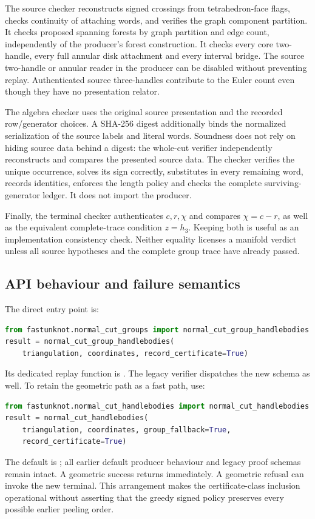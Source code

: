 The source checker reconstructs signed crossings from tetrahedron-face flags,
checks continuity of attaching words, and verifies the graph component
partition. It checks proposed spanning forests by graph partition and edge
count, independently of the producer's forest construction. It checks every
core two-handle, every full annular disk attachment and every interval bridge.
The source two-handle or annular reader in the producer can be disabled without
preventing replay. Authenticated source three-handles contribute to the Euler
count even though they have no presentation relator.

The algebra checker uses the original source presentation and the recorded
row/generator choices. A SHA-256 digest additionally binds the normalized
serialization of the source labels and literal words. Soundness does not rely
on hiding source data behind a digest: the whole-cut verifier independently
reconstructs and compares the presented source data. The checker verifies the
unique occurrence, solves its sign correctly, substitutes in every remaining
word, records identities, enforces the length policy and checks the complete
surviving-generator ledger. It does not import the producer.

Finally, the terminal checker authenticates $c,r,\chi$ and compares
$\chi=c-r$, as well as the equivalent complete-trace condition $z=h_3$.
Keeping both is useful as an implementation consistency check. Neither
equality licenses a manifold verdict unless all source hypotheses and the
complete group trace have already passed.

\subsection{API behaviour and failure semantics}

The direct entry point is:
\begin{lstlisting}[language=Python]
from fastunknot.normal_cut_groups import normal_cut_group_handlebodies
result = normal_cut_group_handlebodies(
    triangulation, coordinates, record_certificate=True)
\end{lstlisting}
Its dedicated replay function is
. The legacy verifier
 dispatches the new schema as well.
To retain the geometric path as a fast path, use:
\begin{lstlisting}[language=Python]
from fastunknot.normal_cut_handlebodies import normal_cut_handlebodies
result = normal_cut_handlebodies(
    triangulation, coordinates, group_fallback=True,
    record_certificate=True)
\end{lstlisting}
The default is ; all earlier default producer
behaviour and legacy proof schemas remain intact. A geometric success returns
immediately. A geometric refusal can invoke the new terminal. This arrangement
makes the certificate-class inclusion operational without asserting that the
greedy signed policy preserves every possible earlier peeling order.

